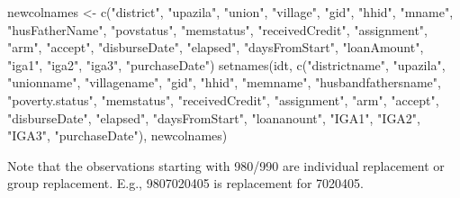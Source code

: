 \begin{Schunk}
\begin{Sinput}
newcolnames <- c("district", "upazila", "union", "village", 
	"gid", "hhid", "mname", "husFatherName", 
	"povstatus", "memstatus", "receivedCredit", "assignment", "arm", 
	"accept", "disburseDate", "elapsed", "daysFromStart",
	"loanAmount", "iga1", "iga2", "iga3", "purchaseDate")
setnames(idt, c("districtname", "upazila", "unionname", "villagename", 
	"gid", "hhid", "memname", "husbandfathersname", 
	"poverty.status", "memstatus", "receivedCredit", "assignment", "arm", 
	"accept", "disburseDate", "elapsed", "daysFromStart",
	"loananount", "IGA1", "IGA2", "IGA3", "purchaseDate"),
	newcolnames)
\end{Sinput}
\end{Schunk}

Note that the observations starting with 980/990 are individual replacement or group replacement. E.g., 9807020405 is replacement for 7020405.
